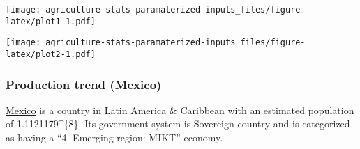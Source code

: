 \documentclass[]{article}
\begin{document}
\texttt{[image: agriculture-stats-paramaterized-inputs\_files/figure-latex/plot1-1.pdf]}

\texttt{[image: agriculture-stats-paramaterized-inputs\_files/figure-latex/plot2-1.pdf]}

\hypertarget{production-trend-mexico}{%
\subsubsection{Production trend
(Mexico)}\label{production-trend-mexico}}

\href{https://en.wikipedia.org/wiki/Mexico}{Mexico} is a country in
Latin America \& Caribbean with an estimated population of
1.1121179\^{}\{8\}. Its government system is Sovereign country
and is categorized as having a ``4. Emerging region: MIKT'' economy.
\end{document}
